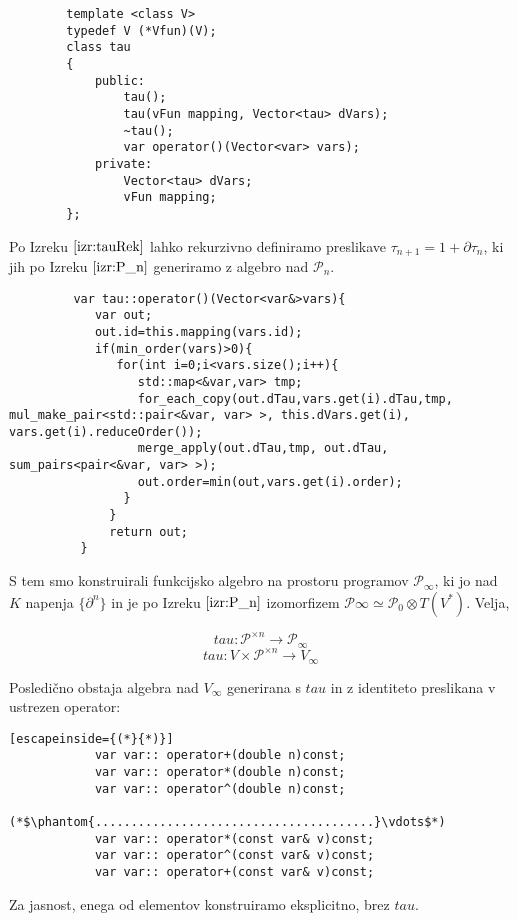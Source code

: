 \documentclass{article}
\newcommand{\dP}{\mathcal{P}}
\newcommand{\D}{\partial}
\newcommand{\sumd}{\tau}
\begin{document}
        \begin{lstlisting}
        template <class V>
        typedef V (*Vfun)(V);
        class tau
        {
            public:
                tau();
                tau(vFun mapping, Vector<tau> dVars);
                ~tau();
                var operator()(Vector<var> vars);
            private:
                Vector<tau> dVars;
                vFun mapping;
        }; 
        \end{lstlisting}

      Po Izreku $\ref{izr:tauRek}$ lahko rekurzivno definiramo preslikave $\sumd_{n+1}=1+\D\sumd_n$, ki jih po Izreku $\ref{izr:P_n}$ generiramo z algebro nad $\dP_n$.
      
      \begin{lstlisting}
         var tau::operator()(Vector<var&>vars){    
            var out;
            out.id=this.mapping(vars.id);
            if(min_order(vars)>0){
               for(int i=0;i<vars.size();i++){
                  std::map<&var,var> tmp;
            	  for_each_copy(out.dTau,vars.get(i).dTau,tmp, mul_make_pair<std::pair<&var, var> >, this.dVars.get(i), vars.get(i).reduceOrder());
            	  merge_apply(out.dTau,tmp, out.dTau, sum_pairs<pair<&var, var> >);
              	  out.order=min(out,vars.get(i).order);
              	}
              }
              return out;
          }
        \end{lstlisting}
      
      S tem smo konstruirali funkcijsko algebro na prostoru programov $\dP_\infty$, ki jo nad $K$ napenja $\{\D^n\}$ in je po Izreku $\ref{izr:P_n}$ izomorfizem $\dP\infty\simeq\dP_0\otimes T(V^*)$. Velja,
      
      $$tau:\dP^{\times n}\to \dP_\infty$$
      $$tau:V\times\dP^{\times n}\to V_\infty$$
    
    Posledično obstaja algebra nad $V_\infty$ generirana s $tau$ in z identiteto preslikana v ustrezen operator:
        
        \begin{lstlisting}[escapeinside={(*}{*)}]
       	    var var:: operator+(double n)const;
            var var:: operator*(double n)const;
            var var:: operator^(double n)const;
            (*$\phantom{.......................................}\vdots$*)
            var var:: operator*(const var& v)const;
            var var:: operator^(const var& v)const;
            var var:: operator+(const var& v)const;
        \end{lstlisting}
      Za jasnost, enega od elementov konstruiramo eksplicitno, brez $tau$.
      
\end{document}
